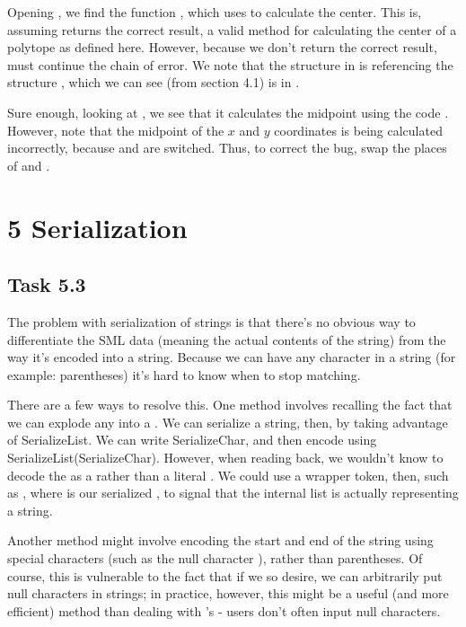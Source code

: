 \documentclass[11pt]{article}
\begin{document}
        Opening , we find the function , which
        uses  to calculate the center. This is,
        assuming  returns the correct result, a valid method
        for calculating the center of a polytope as defined here. However, because
        we don't return the correct result,  must continue
        the chain of error. We note that the structure  in 
         is referencing the structure , which we
        can see (from section 4.1) is in .
        
        Sure enough, looking at , we see that it calculates
        the midpoint using the code 
        . However, 
        note that the midpoint of the $x$ and $y$ coordinates is being calculated
        incorrectly, because  and  are switched. Thus, to correct
        the bug, swap the places of  and .
    
\section*{5 Serialization}
    \subsection*{Task 5.3}
        The problem with serialization of strings is that there's no obvious way
        to differentiate the SML data (meaning the actual contents of the string)
        from the way it's encoded into a string. Because we can have any character
        in a string (for example: parentheses) it's hard to know when to stop
        matching.
        
        There are a few ways to resolve this. One method involves recalling the
        fact that we can explode any  into a .
        We can serialize a string, then, by taking advantage of SerializeList.
        We can write SerializeChar, and then encode using SerializeList(SerializeChar).
        However, when reading back, we wouldn't know to decode the 
        as a  rather than a literal . We could use
        a wrapper token, then, such as , where  is 
        our serialized , to signal that the internal list is 
        actually representing a string.
        
        Another method might involve encoding the start and end of the string using
        special characters (such as the null character ),
        rather than parentheses. Of course, this is vulnerable to the fact that
        if we so desire, we can arbitrarily put null characters in strings; 
        in practice, however, this might be a useful (and more efficient) method
        than dealing with 's - users don't often input null characters.
        
        
\end{document}
